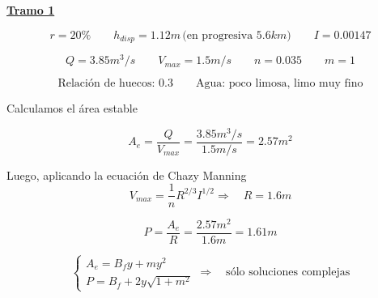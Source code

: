 \underline{\bf Tramo 1}

\begin{equation*}
  r = 20\%
 \qquad
  h_{disp} = 1.12 m \,\text{(en progresiva }5.6 km \text{)}
 \qquad
  I = 0.00147
\end{equation*}

\begin{equation*}
  Q = 3.85 m^3/s
 \qquad
  V_{max} = 1.5 m/s
 \qquad
  n = 0.035
 \qquad
  m = 1
\end{equation*}

\begin{equation*}
  \text{Relación de huecos: 0.3}
  \qquad
  \text{Agua: poco limosa, limo muy fino}
\end{equation*}

Calculamos el área estable

\begin{equation*}
 A_{e} = \dfrac{Q}{V_{max}} = \dfrac{3.85 m^3/s}{1.5 m/s} = 2.57 m^2
\end{equation*}

Luego, aplicando la ecuación de Chazy Manning
\begin{equation*}
 V_{max} =  \frac{1}{n} R^{2/3} I^{1/2}
 \Longrightarrow \quad
 R = 1.6 m
\end{equation*}

\begin{equation*}
 P = \dfrac{A_{e}}{R} = \dfrac{2.57 m^2}{1.6 m} = 1.61 m
\end{equation*}

\begin{equation*}
  \begin{cases}
    A_e = B_{f}y + m y^{2} \\
    P = B_{f} + 2 y \sqrt{1 + m^{2}}
  \end{cases}
  \Longrightarrow \quad
  \text{sólo soluciones complejas}
\end{equation*}
